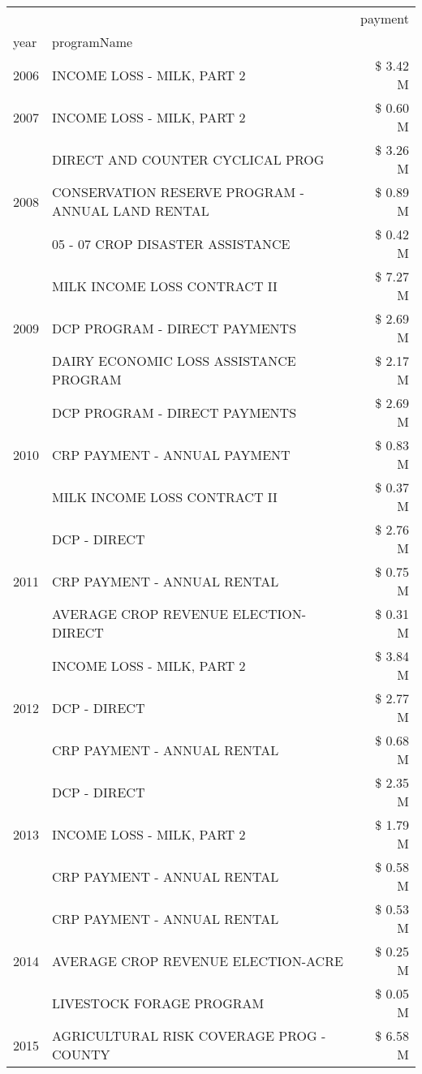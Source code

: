 \begin{tabular}{llr}
\toprule
 &  & payment \\
year & programName &  \\
\midrule
2006 & INCOME LOSS - MILK, PART 2 & \$ 3.42 M \\
\cline{1-3}
2007 & INCOME LOSS - MILK, PART 2 & \$ 0.60 M \\
\cline{1-3}
\multirow[t]{3}{*}{2008} & DIRECT AND COUNTER CYCLICAL PROG & \$ 3.26 M \\
 & CONSERVATION RESERVE PROGRAM - ANNUAL LAND RENTAL & \$ 0.89 M \\
 & 05 - 07 CROP DISASTER ASSISTANCE & \$ 0.42 M \\
\cline{1-3}
\multirow[t]{3}{*}{2009} & MILK INCOME LOSS CONTRACT II & \$ 7.27 M \\
 & DCP PROGRAM - DIRECT PAYMENTS & \$ 2.69 M \\
 & DAIRY ECONOMIC LOSS ASSISTANCE PROGRAM & \$ 2.17 M \\
\cline{1-3}
\multirow[t]{3}{*}{2010} & DCP PROGRAM - DIRECT PAYMENTS & \$ 2.69 M \\
 & CRP PAYMENT - ANNUAL PAYMENT & \$ 0.83 M \\
 & MILK INCOME LOSS CONTRACT II & \$ 0.37 M \\
\cline{1-3}
\multirow[t]{3}{*}{2011} & DCP - DIRECT & \$ 2.76 M \\
 & CRP PAYMENT - ANNUAL RENTAL & \$ 0.75 M \\
 & AVERAGE CROP REVENUE ELECTION-DIRECT & \$ 0.31 M \\
\cline{1-3}
\multirow[t]{3}{*}{2012} & INCOME LOSS - MILK, PART 2 & \$ 3.84 M \\
 & DCP - DIRECT & \$ 2.77 M \\
 & CRP PAYMENT - ANNUAL RENTAL & \$ 0.68 M \\
\cline{1-3}
\multirow[t]{3}{*}{2013} & DCP - DIRECT & \$ 2.35 M \\
 & INCOME LOSS - MILK, PART 2 & \$ 1.79 M \\
 & CRP PAYMENT - ANNUAL RENTAL & \$ 0.58 M \\
\cline{1-3}
\multirow[t]{3}{*}{2014} & CRP PAYMENT - ANNUAL RENTAL & \$ 0.53 M \\
 & AVERAGE CROP REVENUE ELECTION-ACRE & \$ 0.25 M \\
 & LIVESTOCK FORAGE PROGRAM & \$ 0.05 M \\
\cline{1-3}
\multirow[t]{3}{*}{2015} & AGRICULTURAL RISK COVERAGE PROG - COUNTY & \$ 6.58 M \\

\end{tabular}
